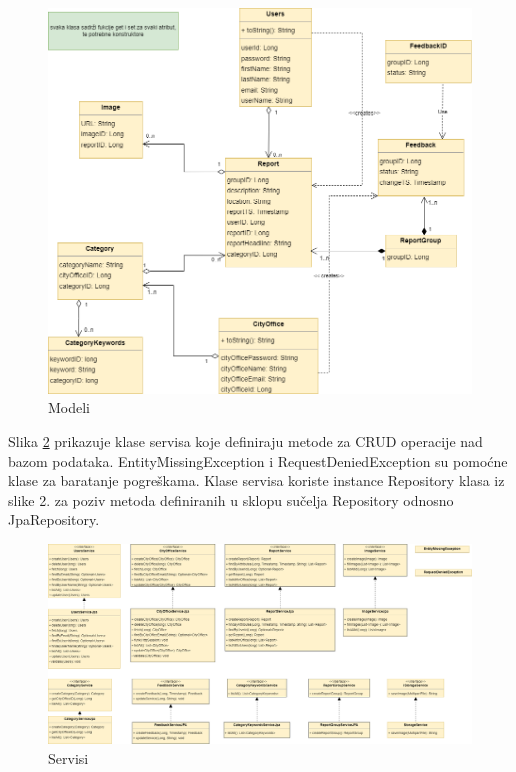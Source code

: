			\begin{figure}[H]
				\includegraphics[width=\textwidth]{slike/repo.png} %
				\caption{Modeli}
				\label{fig:repo} %
			\end{figure}
			
			\eject
			
			Slika \ref{fig:service} prikazuje klase servisa koje definiraju metode za CRUD operacije nad bazom podataka. EntityMissingException i RequestDeniedException su pomoćne klase za baratanje pogreškama. Klase servisa koriste instance Repository klasa iz slike 2. za poziv metoda definiranih u sklopu sučelja Repository odnosno JpaRepository.
			
			\begin{figure}[H]
				\includegraphics[width=\textwidth]{slike/service.png} %
				\caption{Servisi}
				\label{fig:service} %
			\end{figure}
			
